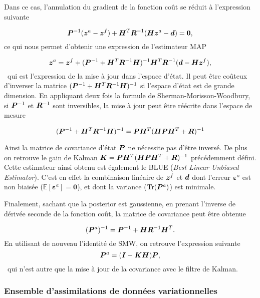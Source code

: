 Dans ce cas, l'annulation du gradient de la fonction coût se réduit à l'expression suivante

\begin{equation*}
    \bm{P}^{-1} (\bm z^a - \bm z^f) + \bm{H}^T \bm{R}^{-1}(\bm{H} \bm z^a - \bm d) = \bm 0,
\end{equation*}ce qui nous permet d'obtenir une expression de l'estimateur MAP

\begin{equation*}
    \bm z^a = \bm z^f + (\bm{P}^{-1} + \bm{H}^T \bm{R}^{-1} \bm{H})^{-1} \bm{H}^T \bm{R}^{-1} (\bm{d} - \bm{H} \bm z^f),
\end{equation*}~qui est l'expression de la mise à jour dans l'espace d'état. Il peut être coûteux d'inverser la matrice $(\bm{P}^{-1} + \bm{H}^T \bm{R}^{-1} \bm{H})^{-1}$ si l'espace d'état est de grande dimension. En appliquant deux fois la formule de Sherman-Morisson-Woodbury, si $\bm{P}^{-1}$ et $\bm{R}^{-1}$ sont inversibles, la mise à jour peut être réécrite dans l'espace de mesure

\begin{equation*}
    (\bm{P}^{-1} + \bm{H}^T \bm{R}^{-1} \bm{H})^{-1} = \bm{P} \bm{H}^T (\bm{H} \bm{P} \bm{H}^T + \bm{R})^{-1}
\end{equation*}

Ainsi la matrice de covariance d'état $\bm{P}$ ne nécessite pas d'être inversé. De plus on retrouve le gain de Kalman $\bm{K} = \bm{P} \bm{H}^T (\bm{H} \bm{P} \bm{H}^T + \bm{R})^{-1}$ précédemment défini. Cette estimateur ainsi obtenu est également le BLUE (\textit{Best Linear Unbiased Estimator}). C'est en effet la combinaison linéaire de $\bm z^f$ et $\bm{d}$ dont l'erreur $\bm \varepsilon^a$ est non biaisée ($\mathbb{E}[\bm \varepsilon^a] = \bm 0$), et dont la variance ($\operatorname{Tr}(\bm{P}^a)$) est minimale.

Finalement, sachant que la posterior est gaussienne, en prenant l'inverse de dérivée seconde de la fonction coût, la matrice de covariance peut être obtenue

\begin{equation*}
    (\bm{P}^a)^{-1} = \bm{P}^{-1} + \bm{H} \bm{R}^{-1} \bm{H}^T.
\end{equation*}En utilisant de nouveau l'identité de SMW, on retrouve l'expression suivante
\begin{equation*}
    \bm{P}^a = (\bm{I} - \bm{K} \bm{H}) \bm{P},
\end{equation*}~qui n'est autre que la mise à jour de la covariance avec le filtre de Kalman.

\subsubsection{Ensemble d'assimilations de données variationnelles}%

